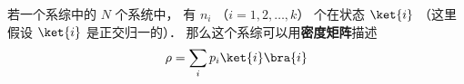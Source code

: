 
若一个系综中的 $N$ 个系统中， 有 $n_i$ （$i = 1,2,\dots,k$） 个在状态 $\ket{i}$ （这里假设 $\ket{i}$ 是正交归一的）． 那么这个系综可以用\textbf{密度矩阵}描述
\begin{equation}
\rho = \sum_i p_i\ket{i}\bra{i}
\end{equation}

